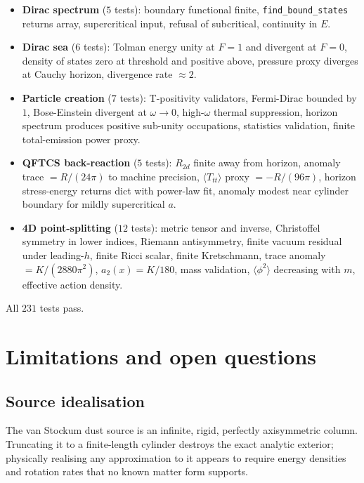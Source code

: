 \documentclass[11pt,a4paper]{article}
\begin{document}
\begin{itemize}[leftmargin=*]
cylindrical Minkowski and van Stockum interior, tetrad
orthonormality, radial Dirac system runs, solver runs in Minkowski,
van Stockum specialisation requires supercritical input.
\item \textbf{Dirac spectrum} ($5$ tests): boundary functional finite,
\texttt{find\_bound\_states} returns array, supercritical input, refusal
of subcritical, continuity in $E$.
\item \textbf{Dirac sea} ($6$ tests): Tolman energy unity at $F = 1$ and
divergent at $F = 0$, density of states zero at threshold and positive
above, pressure proxy diverges at Cauchy horizon, divergence rate
$\approx 2$.
\item \textbf{Particle creation} ($7$ tests): T-positivity validators,
Fermi-Dirac bounded by $1$, Bose-Einstein divergent at $\omega \to 0$,
high-$\omega$ thermal suppression, horizon spectrum produces positive
sub-unity occupations, statistics validation, finite total-emission
power proxy.
\item \textbf{QFTCS back-reaction} ($5$ tests): $R_{2d}$ finite away
from horizon, anomaly trace $= R/(24\pi)$ to machine precision,
$\langle T_{tt} \rangle$ proxy $= -R/(96\pi)$, horizon stress-energy
returns dict with power-law fit, anomaly modest near cylinder boundary
for mildly supercritical $a$.
\item \textbf{4D point-splitting} ($12$ tests): metric tensor and
inverse, Christoffel symmetry in lower indices, Riemann antisymmetry,
finite vacuum residual under leading-$h$, finite Ricci scalar,
finite Kretschmann, trace anomaly $= K/(2880\pi^2)$, $a_2(x) = K/180$,
mass validation, $\langle\phi^2\rangle$ decreasing with $m$, effective
action density.
\end{itemize}

All $231$ tests pass.

\section{Limitations and open questions}

\subsection{Source idealisation}

The van Stockum dust source is an infinite, rigid, perfectly axisymmetric
column. Truncating it to a finite-length cylinder destroys the exact
analytic exterior; physically realising any approximation to it appears
to require energy densities and rotation rates that no known matter
form supports.
\end{document}
